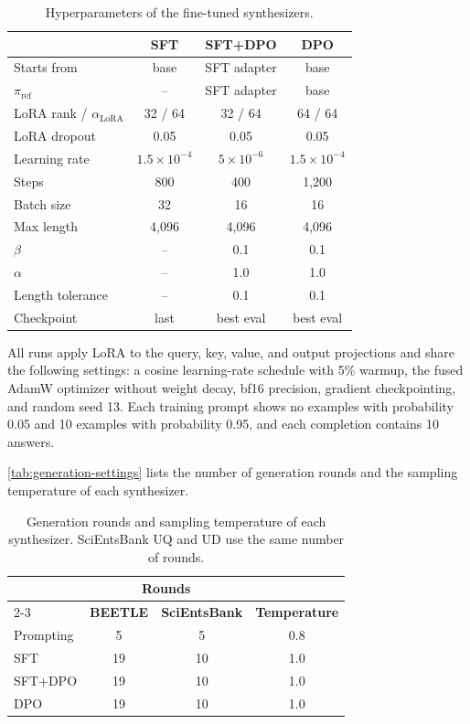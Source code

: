 \begin{table}[t]
    \centering
    \small
    \setlength{\tabcolsep}{4pt}
    \begin{tabular}{@{}lccc@{}}
    \hline
    & \textbf{SFT} & \textbf{SFT+DPO} & \textbf{DPO} \\
    \hline
    Starts from & base & SFT adapter & base \\
    $\pi_{\mathrm{ref}}$ & -- & SFT adapter & base \\
    LoRA rank / $\alpha_{\mathrm{LoRA}}$ & 32 / 64 & 32 / 64 & 64 / 64 \\
    LoRA dropout & 0.05 & 0.05 & 0.05 \\
    Learning rate & $1.5\times10^{-4}$ & $5\times10^{-6}$ & $1.5\times10^{-4}$ \\
    Steps & 800 & 400 & 1,200 \\
    Batch size & 32 & 16 & 16 \\
    Max length & 4,096 & 4,096 & 4,096 \\
    $\beta$ & -- & 0.1 & 0.1 \\
    $\alpha$ & -- & 1.0 & 1.0 \\
    Length tolerance & -- & 0.1 & 0.1 \\
    Checkpoint & last & best eval & best eval \\
    \hline
    \end{tabular}
    \caption{Hyperparameters of the fine-tuned synthesizers.}
    \label{tab:synthesizer-hyperparameters}
\end{table}

All runs apply LoRA to the query, key, value, and output projections and share the following settings: a cosine learning-rate schedule with 5\% warmup, the fused AdamW optimizer without weight decay, bf16 precision, gradient checkpointing, and random seed 13. Each training prompt shows no examples with probability 0.05 and 10 examples with probability 0.95, and each completion contains 10 answers.

\autoref{tab:generation-settings} lists the number of generation rounds and the sampling temperature of each synthesizer.

\begin{table}[t]
    \centering
    \small
    \begin{tabular}{@{}lccc@{}}
    \hline
    & \multicolumn{2}{c}{\textbf{Rounds}} & \\
    \cline{2-3}
    & \textbf{BEETLE} & \textbf{SciEntsBank} & \textbf{Temperature} \\
    \hline
    Prompting & 5 & 5 & 0.8 \\
    SFT & 19 & 10 & 1.0 \\
    SFT+DPO & 19 & 10 & 1.0 \\
    DPO & 19 & 10 & 1.0 \\
    \hline
    \end{tabular}
    \caption{Generation rounds and sampling temperature of each synthesizer. SciEntsBank UQ and UD use the same number of rounds.}
    \label{tab:generation-settings}
\end{table}

